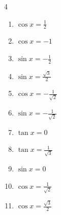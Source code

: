 \begin{multicols}{4}
\begin{enumerate}

\columnbreak %

  \item $\displaystyle \cos{x}  = \frac{1}{2}$


  \item $\displaystyle \cos{x}  = -1$


  \item $\displaystyle \sin{x}  = -\frac{1}{2}$


  \item $\displaystyle \sin{x}  = \frac{\sqrt{3}}{2}$


  \item $\displaystyle \cos{x}  = -\frac{1}{\sqrt{2}}$


  \item $\displaystyle \sin{x}  = -\frac{1}{\sqrt{2}}$


  \item $\displaystyle \tan{x}  = 0$


  \item $\displaystyle \tan{x}  = \frac{1}{\sqrt{3}}$


  \item $\displaystyle \sin{x}  = 0$


  \item $\displaystyle \cos{x}  = \frac{1}{\sqrt{2}}$


  \item $\displaystyle \cos{x}  = \frac{\sqrt{3}}{2}$


\end{enumerate}
\end{multicols}
